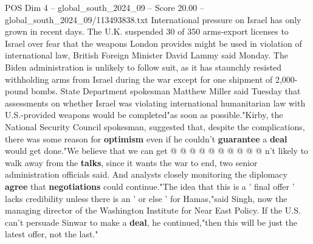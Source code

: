 \begin{textsample}{POS Dim 4 – global\_south\_2024\_09 – Score 20.00 – global\_south\_2024\_09/113493838.txt}
International pressure on Israel has only grown in recent days.
The U.K. suspended 30 of 350 arms-export licenses to Israel over fear that the weapons London provides might be used in violation of international law, British Foreign Minister David Lammy said Monday.
The Biden administration is unlikely to follow suit, as it has staunchly resisted withholding arms from Israel during the war except for one shipment of 2,000-pound bombs.
State Department spokesman Matthew Miller said Tuesday that assessments on whether Israel was violating international humanitarian law with U.S.-provided weapons would be completed"as soon as possible."Kirby, the National Security Council spokesman, suggested that, despite the complications, there was some reason for \textbf{optimism} even if he couldn't \textbf{guarantee} a \textbf{deal} would get done."We believe that we can get @ @ @ @ @ @ @ @ @ @ n't likely to walk away from the \textbf{talks}, since it wants the war to end, two senior administration officials said.
And analysts closely monitoring the diplomacy \textbf{agree} that \textbf{negotiations} could continue."The idea that this is a ' final offer ' lacks credibility unless there is an ' or else ' for Hamas,"said Singh, now the managing director of the Washington Institute for Near East Policy.
If the U.S. can't persuade Sinwar to make a \textbf{deal}, he continued,"then this will be just the latest offer, not the last."

\end{textsample}
